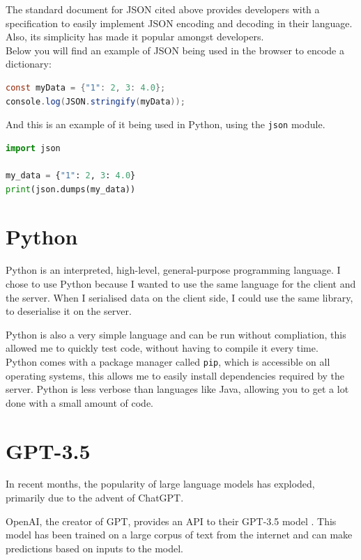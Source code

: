 The standard document for JSON cited above
provides developers with a specification to easily
implement JSON encoding and decoding in their language.
Also, its simplicity has made it popular amongst developers. \\

Below you will find an example of JSON being used in the browser to encode a dictionary:

\begin{lstlisting}[language=Java]
const myData = {"1": 2, 3: 4.0};
console.log(JSON.stringify(myData));
\end{lstlisting}

And this is an example of it being used in Python, using the \texttt{json} module.

\begin{lstlisting}[language=Python]
import json

my_data = {"1": 2, 3: 4.0}
print(json.dumps(my_data))
\end{lstlisting}

\section{Python}
Python \cite{python} is an interpreted, high-level, general-purpose programming language.
I chose to use Python because I wanted to use the same language for the client and the server.
When I serialised data on the client side, I could use the same
 library, to deserialise it on the server.

Python is also a very simple language and can be run without compliation,
this allowed me to quickly test code, without having to compile it every time. \\

Python comes with a package manager called \texttt{pip},
which is accessible on all operating systems,
this allows me to easily install dependencies required by the server.
Python is less verbose than languages like Java,
allowing you to get a lot done with a small amount of code.

\section{GPT-3.5}
In recent months, the popularity of large language models has exploded,
primarily due to the advent of ChatGPT.

OpenAI, the creator of GPT, provides an
API to their GPT-3.5 model \cite{openai}.
This model has been trained on a large corpus of text from the internet
and can make predictions based on inputs to the model. \\

